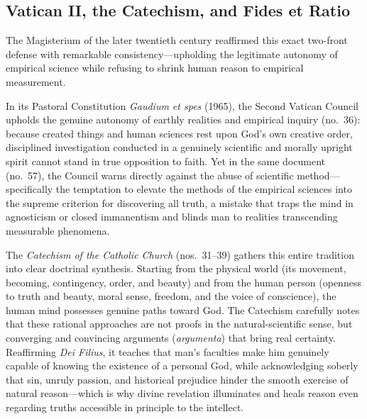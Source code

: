 \subsection{Vatican II, the Catechism, and Fides et Ratio}

The Magisterium of the later twentieth century reaffirmed this exact two-front defense with remarkable consistency---upholding the legitimate autonomy of empirical science while refusing to shrink human reason to empirical measurement.

In its Pastoral Constitution \emph{Gaudium et spes} (1965), the Second Vatican Council upholds the genuine autonomy of earthly realities and empirical inquiry (no.\ 36): because created things and human sciences rest upon God's own creative order, disciplined investigation conducted in a genuinely scientific and morally upright spirit cannot stand in true opposition to faith. Yet in the same document (no.\ 57), the Council warns directly against the abuse of scientific method---specifically the temptation to elevate the methods of the empirical sciences into the supreme criterion for discovering all truth, a mistake that traps the mind in agnosticism or closed immanentism and blinds man to realities transcending measurable phenomena.

The \emph{Catechism of the Catholic Church} (nos.\ 31--39) gathers this entire tradition into clear doctrinal synthesis. Starting from the physical world (its movement, becoming, contingency, order, and beauty) and from the human person (openness to truth and beauty, moral sense, freedom, and the voice of conscience), the human mind possesses genuine paths toward God. The Catechism carefully notes that these rational approaches are not proofs in the natural-scientific sense, but converging and convincing arguments (\emph{argumenta}) that bring real certainty. Reaffirming \emph{Dei Filius}, it teaches that man's faculties make him genuinely capable of knowing the existence of a personal God, while acknowledging soberly that sin, unruly passion, and historical prejudice hinder the smooth exercise of natural reason---which is why divine revelation illuminates and heals reason even regarding truths accessible in principle to the intellect.

